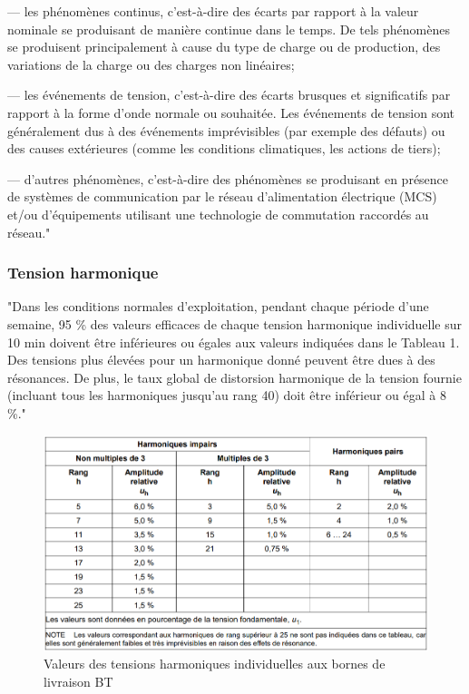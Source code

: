 — les phénomènes continus, c'est-à-dire des écarts par rapport à la valeur nominale se produisant de manière continue dans le temps. De tels phénomènes se produisent principalement à cause du type de charge ou de production, des variations de la charge ou des charges non linéaires;

— les événements de tension, c'est-à-dire des écarts brusques et significatifs par rapport à la forme d'onde normale ou souhaitée. Les événements de tension sont généralement dus à des événements imprévisibles (par exemple des défauts) ou des causes extérieures (comme les conditions climatiques, les actions de tiers);

— d'autres phénomènes, c'est-à-dire des phénomènes se produisant en présence de systèmes de communication par le réseau d'alimentation électrique (MCS) et/ou d'équipements utilisant une technologie de commutation raccordés au réseau."





\subsubsection{Tension harmonique}

"Dans les conditions normales d'exploitation, pendant chaque période d'une semaine, 95 \% des valeurs efficaces de chaque tension harmonique individuelle sur 10 min doivent être inférieures ou égales aux valeurs indiquées dans le Tableau 1. Des tensions plus élevées pour un harmonique donné peuvent être dues à des résonances.
De plus, le taux global de distorsion harmonique de la tension fournie (incluant tous les harmoniques jusqu'au rang 40) doit être inférieur ou égal à 8 \%."

\begin{figure}[H]
    \begin{center}
        \includegraphics[width=\textwidth]{assets/figures/tab_en50160.png}
    \end{center}
    \caption{Valeurs des tensions harmoniques individuelles aux bornes de livraison BT}
    \label{tab_en50160}
\end{figure}


